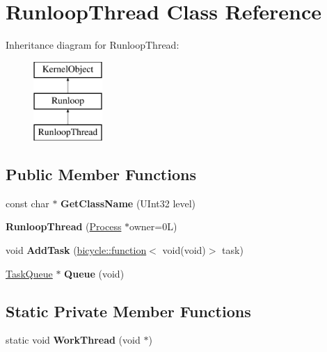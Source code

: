 \hypertarget{class_runloop_thread}{}\section{Runloop\+Thread Class Reference}
\label{class_runloop_thread}
Inheritance diagram for Runloop\+Thread\+:\begin{figure}[H]
\begin{center}
\leavevmode
\includegraphics[height=3.000000cm]{class_runloop_thread}
\end{center}
\end{figure}
\subsection*{Public Member Functions}
\begin{DoxyCompactItemize}
\item 
\mbox{\label{class_runloop_thread_a2630a57d6d97a0cca01e15a64191b6f8}} 
const char $\ast$ {\bfseries Get\+Class\+Name} (U\+Int32 level)
\item 
\mbox{\label{class_runloop_thread_a3ca9e14fcac1cd8aec3901772f568e14}} 
{\bfseries Runloop\+Thread} (\hyperlink{class_process}{Process} $\ast$owner=0\+L)
\item 
\mbox{\label{class_runloop_thread_af37c487cf24e7f4ed2d8ea05eb9cd083}} 
void {\bfseries Add\+Task} (\hyperlink{classbicycle_1_1function}{bicycle\+::function}$<$ void(void)$>$ task)
\item 
\mbox{\label{class_runloop_thread_a9eefcaf072160127daafbcb26a5fdf9b}} 
\hyperlink{class_task_queue}{Task\+Queue} $\ast$ {\bfseries Queue} (void)
\end{DoxyCompactItemize}
\subsection*{Static Private Member Functions}
\begin{DoxyCompactItemize}
\item 
\mbox{\label{class_runloop_thread_a046d7c06797d051e8a3a13d672fa1d7a}} 
static void {\bfseries Work\+Thread} (void $\ast$)
\end{DoxyCompactItemize}
